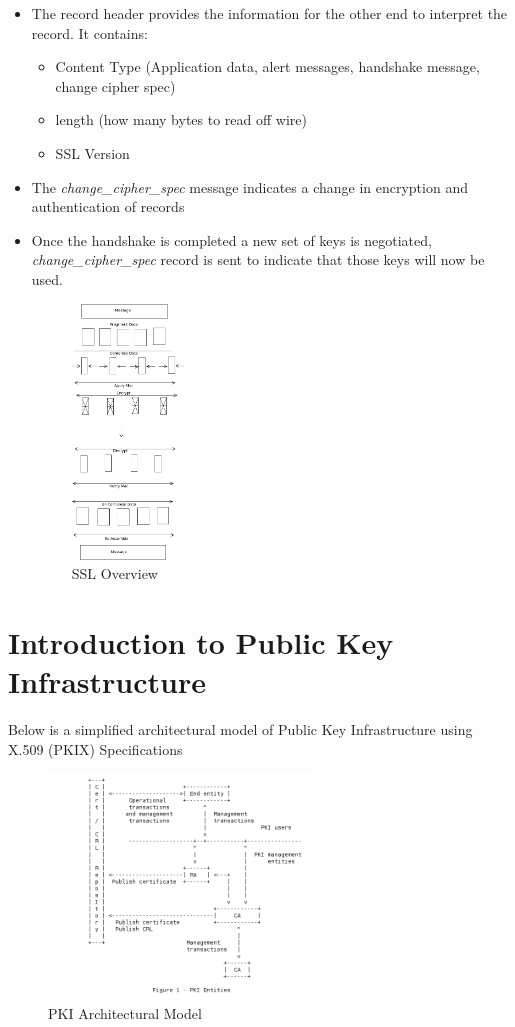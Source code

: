 \documentclass[a4paper]{article}
\begin{document}
\begin{itemize}
\begin{itemize}
                \item The record header provides the information for the other end to interpret the record. It contains:
                    \begin{itemize}
                        \item Content Type (Application data, alert messages, handshake message, change cipher spec)
                        \item length  (how many bytes to read off wire)
                        \item SSL Version
                    \end{itemize}
                \item The \textit{change\_cipher\_spec} message indicates a change in encryption and authentication of records
                \item Once the handshake is completed a new set of keys is negotiated, \textit{change\_cipher\_spec} record is 
                    sent to indicate that those keys will now be used.
                    \begin{figure}[H]
                        \centering
                        \includegraphics[width=30mm]{ssl-overview.png}
                        \caption{SSL Overview}
                    \end{figure}
            \end{itemize}
    \end{itemize}
\section{Introduction to Public Key Infrastructure}
Below is a simplified architectural model of Public Key Infrastructure using X.509 (PKIX) Specifications
\begin{figure}[ht!]
    \centering
    \includegraphics[width=70mm]{pki-architectural-model.png}
    \caption{PKI Architectural Model ~\cite{5280}}
\end{figure}
\end{document}
